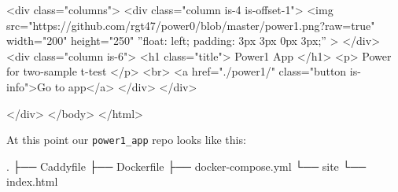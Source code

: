 \documentclass[
  letterpaper,
  DIV=11,
  numbers=noendperiod,
  oneside]{scrartcl}
\newenvironment{Shaded}{\begin{snugshade}}{\end{snugshade}}
\newcommand{\ControlFlowTok}[1]{\textcolor[rgb]{0.00,0.23,0.31}{#1}}
\newcommand{\ErrorTok}[1]{\textcolor[rgb]{0.68,0.00,0.00}{#1}}
\newcommand{\NormalTok}[1]{\textcolor[rgb]{0.00,0.23,0.31}{#1}}
\newcommand{\OtherTok}[1]{\textcolor[rgb]{0.00,0.23,0.31}{#1}}
\newcommand{\SpecialCharTok}[1]{\textcolor[rgb]{0.37,0.37,0.37}{#1}}
\newcommand{\StringTok}[1]{\textcolor[rgb]{0.13,0.47,0.30}{#1}}
\begin{document}
\begin{Shaded}
\begin{Highlighting}[]
            \ErrorTok{\textless{}}\NormalTok{div class}\OtherTok{=}\StringTok{"columns"}\SpecialCharTok{\textgreater{}}
              \ErrorTok{\textless{}}\NormalTok{div class}\OtherTok{=}\StringTok{"column is{-}4 is{-}offset{-}1"}\SpecialCharTok{\textgreater{}}
      \ErrorTok{\textless{}}\NormalTok{img src}\OtherTok{=}\StringTok{"https://github.com/rgt47/power0/blob/master/power1.png?raw=true"}
\NormalTok{        width}\OtherTok{=}\StringTok{"200"}\NormalTok{ height}\OtherTok{=}\StringTok{"250"}\NormalTok{  ”float}\SpecialCharTok{:}\NormalTok{ left; padding}\SpecialCharTok{:}\NormalTok{ 3px 3px 0px 3px;” }\SpecialCharTok{\textgreater{}}
              \ErrorTok{\textless{}/}\NormalTok{div}\SpecialCharTok{\textgreater{}}
              \ErrorTok{\textless{}}\NormalTok{div class}\OtherTok{=}\StringTok{"column is{-}6"}\SpecialCharTok{\textgreater{}}
                \ErrorTok{\textless{}}\NormalTok{h1 class}\OtherTok{=}\StringTok{"title"}\SpecialCharTok{\textgreater{}}\NormalTok{ Power1 App }\SpecialCharTok{\textless{}}\ErrorTok{/}\NormalTok{h1}\SpecialCharTok{\textgreater{}}
                \ErrorTok{\textless{}}\NormalTok{p}\SpecialCharTok{\textgreater{}}\NormalTok{ Power }\ControlFlowTok{for}\NormalTok{ two}\SpecialCharTok{{-}}\NormalTok{sample t}\SpecialCharTok{{-}}\NormalTok{test }\SpecialCharTok{\textless{}}\ErrorTok{/}\NormalTok{p}\SpecialCharTok{\textgreater{}}
                \ErrorTok{\textless{}}\NormalTok{br}\SpecialCharTok{\textgreater{}}
                \ErrorTok{\textless{}}\NormalTok{a href}\OtherTok{=}\StringTok{"./power1/"}\NormalTok{ class}\OtherTok{=}\StringTok{"button is{-}info"}\SpecialCharTok{\textgreater{}}\NormalTok{Go to app}\SpecialCharTok{\textless{}}\ErrorTok{/}\NormalTok{a}\SpecialCharTok{\textgreater{}}
              \ErrorTok{\textless{}/}\NormalTok{div}\SpecialCharTok{\textgreater{}}
            \ErrorTok{\textless{}/}\NormalTok{div}\SpecialCharTok{\textgreater{}}

    \ErrorTok{\textless{}/}\NormalTok{div}\SpecialCharTok{\textgreater{}}
  \ErrorTok{\textless{}/}\NormalTok{body}\SpecialCharTok{\textgreater{}}
\ErrorTok{\textless{}/}\NormalTok{html}\SpecialCharTok{\textgreater{}}
\end{Highlighting}
\end{Shaded}

At this point our \texttt{power1\_app} repo looks like this:

\begin{Shaded}
\begin{Highlighting}[]
\NormalTok{.}
\NormalTok{├── Caddyfile}
\NormalTok{├── Dockerfile}
\NormalTok{├── docker{-}compose.yml}
\NormalTok{└── site}
\NormalTok{    └── index.html}
\end{Highlighting}
\end{Shaded}
\end{document}
